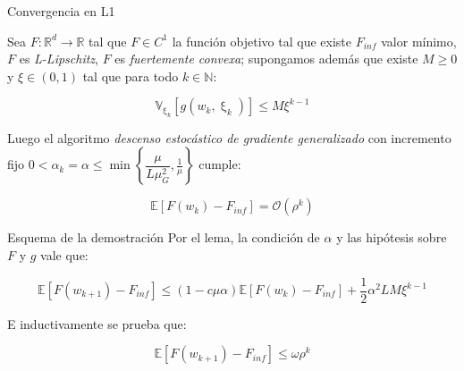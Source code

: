 \documentclass{beamer}
\newcommand{\R}{{\mathbb{R}}}
\newcommand{\N}{{\mathbb{N}}}
\newcommand{\sett}[1]{\left\lbrace#1\right\rbrace}
\newcommand{\expectation}[1]{\mathbb{E} \left[#1\right]}
\newcommand{\variancesub}[2]{\mathbb{V}_{#1} \left[#2\right]}
\newcommand{\variancechik}[1]{\variancesub{\upxi_{k}}{#1}}
\begin{document}
\begin{frame}{Convergencia en L1}
\begin{theorem}
	Sea $F: \R^d \rightarrow \R$ tal que $F \in C^1$ la funci\'on objetivo tal que existe $F_{inf}$ valor m\'inimo, $F$ es \textit{L-Lipschitz}, $F$ es \textit{fuertemente convexa}; supongamos adem\'as que existe $M \geq 0$ y $\xi \in (0,1)$ tal que para todo $k \in \N$:
	
	\begin{equation*}
	\variancechik{g(w_k, \upxi_{k})} \leq M \xi^{k-1}
	\end{equation*}
	
	Luego el algoritmo \textit{descenso estoc\'astico de gradiente generalizado} con incremento fijo $0  < \alpha_k = \alpha \leq \min\sett{\dfrac{\mu}{L \mu_G^2}, \frac{1}{ \mu}} $ cumple:
	
	\begin{equation*}
	\expectation{F(w_k) - F_{inf}} = \mathcal{O} \left(\rho^{k}\right)
	\end{equation*}
	
\end{theorem}
\end{frame}

\begin{frame}{Esquema de la demostraci\'on}
	Por el lema, la condici\'on de $\alpha$ y las hip\'otesis sobre $F$ y $g$ vale que:
	
\begin{equation*}
\expectation{F(w_{k+1}) - F_{inf}} \leq \left(1 - c \mu \alpha\right) \expectation{F(w_k) - F_{inf}} + \frac{1}{2} \alpha^2 LM \xi^{k-1}
\end{equation*}

E inductivamente se prueba que:

\begin{equation*}
\expectation{F(w_{k+1}) - F_{inf}}  \leq  \omega \rho^{k}
\end{equation*}
\end{frame}
\end{document}

